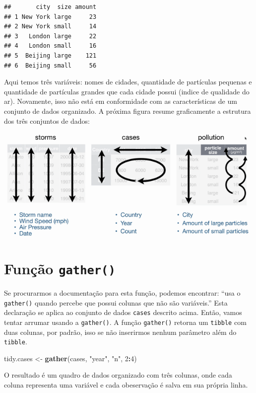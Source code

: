 \documentclass[a4paper]{book}
\newenvironment{Shaded}{\begin{snugshade}}{\end{snugshade}}
\newcommand{\DecValTok}[1]{\textcolor[rgb]{0.00,0.00,0.81}{#1}}
\newcommand{\KeywordTok}[1]{\textcolor[rgb]{0.13,0.29,0.53}{\textbf{#1}}}
\newcommand{\NormalTok}[1]{#1}
\newcommand{\OperatorTok}[1]{\textcolor[rgb]{0.81,0.36,0.00}{\textbf{#1}}}
\newcommand{\StringTok}[1]{\textcolor[rgb]{0.31,0.60,0.02}{#1}}
\begin{document}
\begin{verbatim}
##       city  size amount
## 1 New York large     23
## 2 New York small     14
## 3   London large     22
## 4   London small     16
## 5  Beijing large    121
## 6  Beijing small     56
\end{verbatim}

Aqui temos três variáveis: nomes de cidades, quantidade de partículas pequenas e quantidade de partículas grandes que cada cidade possui (indice de qualidade do ar). Novamente, isso não está em conformidade com as características de um conjunto de dados organizado. A próxima figura resume graficamente a estrutura dos três conjuntos de dados:

\begin{center}\includegraphics[width=0.5\linewidth]{imagens/tidy_data} \end{center}

\hypertarget{funuxe7uxe3o-gather}{%
\section{\texorpdfstring{Função \texttt{gather()}}{Função gather()}}\label{funuxe7uxe3o-gather}}

Se procurarmos a documentação para esta função, podemos encontrar: ``usa o \texttt{gather()} quando percebe que possui colunas que não são variáveis.'' Esta declaração se aplica ao conjunto de dados \texttt{cases} descrito acima. Então, vamos tentar arrumar usando a \texttt{gather()}. A função \texttt{gather()} retorna um \texttt{tibble} com duas colunas, por padrão, isso se não inserirmos nenhum parâmetro além do \texttt{tibble}.

\begin{Shaded}
\begin{Highlighting}[]
\NormalTok{tidy.cases <-}\StringTok{ }\KeywordTok{gather}\NormalTok{(cases, }\StringTok{"year"}\NormalTok{, }\StringTok{"n"}\NormalTok{, }\DecValTok{2}\OperatorTok{:}\DecValTok{4}\NormalTok{)}
\end{Highlighting}
\end{Shaded}

O resultado é um quadro de dados organizado com três colunas, onde cada coluna representa uma variável e cada obeservação é salva em sua própria linha.
\end{document}
